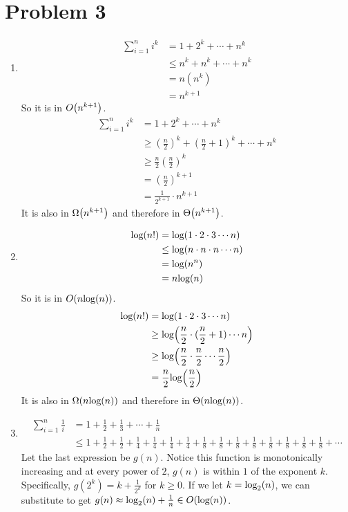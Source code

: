 \documentclass[11pt]{article}
\newcounter{problemnumber}
\let\origleft\left
\let\origright\right
\renewcommand{\left}{\mathopen{}\mathclose\bgroup\origleft}
\renewcommand{\right}{\aftergroup\egroup\origright}
\newcommand{\p}[1]{\left(#1\right)}
\renewcommand{\log}[1]{\text{log}\p{#1}}
\newcommand{\logb}[2]{\text{log}_{#1}\p{#2}}
\newcommand{\BigOh}[1]{O\p{#1}}
\newcommand{\BigOmega}[1]{\Omega\p{#1}}
\newcommand{\BigTheta}[1]{\Theta\p{#1}}
\begin{document}
\section*{Problem 3}
\begin{enumerate}[1.]
\item \begin{align*}
\sum_{i=1}^n i^k &= 1 + 2^k + \cdots + n^k \\
&\leq n^k + n^k + \cdots + n^k \\
&= n(n^k) \\
&= n^{k+1}
\end{align*}
So it is in $\BigOh{n^{k+1}}$.
\begin{align*}
\sum_{i=1}^n i^k &= 1 + 2^k + \cdots + n^k \\
&\geq (\frac n2)^k + (\frac n2 + 1)^k + \cdots + n^k \\
&\geq \frac n2 (\frac n2)^k \\
&= (\frac n2)^{k+1} \\
&= \frac 1{2^{k+1}} \cdot n^{k+1}
\end{align*}
It is also in $\BigOmega{n^{k+1}}$ and therefore in $\BigTheta{n^{k+1}}$.
\\
\item \begin{align*}
\log{n!} &= \log{1\cdot2\cdot3\cdots n} \\
&\leq \log{n\cdot n\cdot n\cdots n} \\
&= \log{n^n} \\
&= n\log n
\end{align*}
So it is in $\BigOh{n \log n}$.
\begin{align*}
\log{n!} &= \log{1\cdot2\cdot3\cdots n} \\
&\geq \log{\frac n2 \cdot (\frac n2 + 1) \cdots n} \\
&\geq \log{\frac n2 \cdot \frac n2 \cdots \frac n2} \\
&= \frac n2 \log{\frac n2}
\end{align*}
It is also in $\BigOmega{n \log n}$ and therefore in $\BigTheta{n \log n}$.
\newpage
\item
\begin{align*}
\sum_{i=1}^n \frac 1i &= 1 + \frac12 + \frac13 + \cdots + \frac1n \\
&\leq 1+\frac12+\frac12+\frac14+\frac14+\frac14+\frac14+\frac18+\frac18+\frac18+\frac18+\frac18+\frac18+\frac18+\frac18+\cdots
\end{align*}
Let the last expression be $g(n)$. Notice this function is monotonically increasing and at every power of $2$, $g(n)$ is within $1$ of the exponent $k$. Specifically, $g(2^k) = k + \frac1{2^k}$ for $k \geq 0$. If we let $k=\logb2n$, we can substitute to get $g(n) \approx \logb2n + \frac1n \in \BigOh{\log n}$. \\\\

\end{enumerate}
\end{document}
